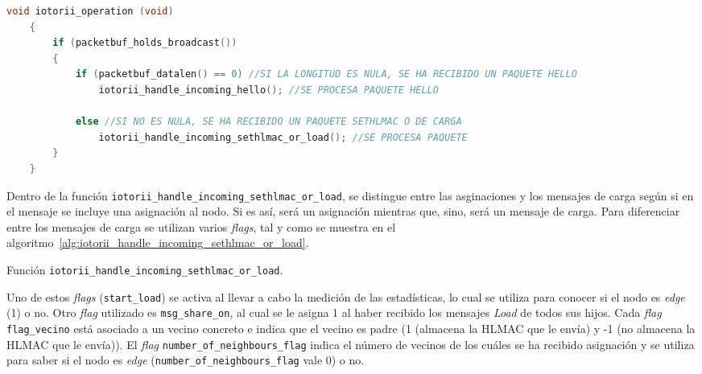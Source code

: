 \begin{lstlisting}[label={lst:broadcast},language=C,style=Cnice,firstnumber=1,caption={Tratamiento de mensajes \textit{broadcast} únicamente.}]
    void iotorii_operation (void)
    {
        if (packetbuf_holds_broadcast())
        {
            if (packetbuf_datalen() == 0) //SI LA LONGITUD ES NULA, SE HA RECIBIDO UN PAQUETE HELLO
                iotorii_handle_incoming_hello(); //SE PROCESA PAQUETE HELLO
        
            else //SI NO ES NULA, SE HA RECIBIDO UN PAQUETE SETHLMAC O DE CARGA
                iotorii_handle_incoming_sethlmac_or_load(); //SE PROCESA PAQUETE
        }
    }
\end{lstlisting}

Dentro de la función \texttt{iotorii\_handle\_incoming\_sethlmac\_or\_load}, se distingue entre las asginaciones y los mensajes de carga según si en el mensaje se incluye una asignación al nodo.
Si es así, será un asignación mientras que, sino, será un mensaje de carga.
Para diferenciar entre los mensajes de carga se utilizan varios \textit{flags}, tal y como se muestra en el algoritmo~\ref{alg:iotorii_handle_incoming_sethlmac_or_load}.

\begin{algorithm}
    \caption{Función \texttt{iotorii\_handle\_incoming\_sethlmac\_or\_load}.}
    \label{alg:iotorii_handle_incoming_sethlmac_or_load}
\end{algorithm}

Uno de estos \textit{flags} (\texttt{start\_load}) se activa al llevar a cabo la medición de las estadísticas, lo cual se utiliza para conocer si el nodo es \textit{edge} (1) o no.
Otro \textit{flag} utilizado es \texttt{msg\_share\_on}, al cual se le asigna 1 al haber recibido los mensajes \textit{Load} de todos sus hijos.
Cada \textit{flag} \texttt{flag\_vecino} está asociado a un vecino concreto e indica que el vecino es padre (1 (almacena la HLMAC que le envía) y -1 (no almacena la HLMAC que le envía)).
El \textit{flag} \texttt{number\_of\_neighbours\_flag} indica el número de vecinos de los cuáles se ha recibido asignación y se utiliza para saber si el nodo es \textit{edge} (\texttt{number\_of\_neighbours\_flag} vale 0) o no.


